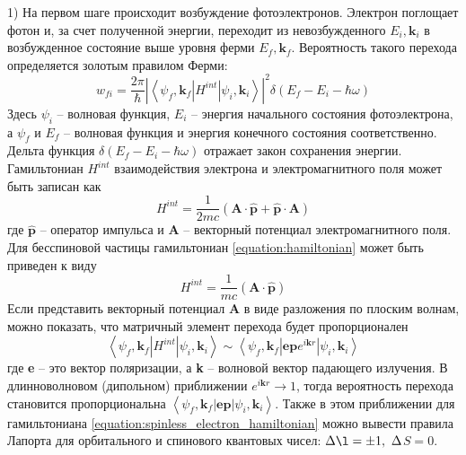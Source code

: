 1) На первом шаге происходит возбуждение фотоэлектронов.
Электрон поглощает фотон и, за счет полученной энергии, переходит из
невозбужденного $E_i, \textbf{k}_i$  в возбужденное состояние выше 
уровня ферми $E_f, \textbf{k}_f$. Вероятность такого перехода 
определяется золотым правилом Ферми:
	\begin{equation} 
		\label{Fermi_rule}
		w_{fi}=\frac{2\pi}{\hbar}|\left\langle\psi_f,\textbf{k}_f|H^{int}|
		\psi_i,\textbf{k}_i\right\rangle|^2\delta(E_f-E_i-\hbar\omega)
	\end{equation}
Здесь $\psi_i$ -- волновая функция, $E_i$ -- энергия начального состояния
фотоэлектрона, а  $\psi_f$ и $E_f$ -- волновая функция и энергия 
конечного состояния соответственно. Дельта функция $\delta(E_f-E_i-\hbar\omega)$
отражает закон сохранения энергии. Гамильтониан $H^{int}$ взаимодействия
электрона и электромагнитного поля может быть записан как
	\begin{equation} 
	\label{equation:hamiltonian}
		H^{int}=\frac{1}{2mc}(\textbf{A}\cdot\hat{\textbf{p}}+\hat{\textbf{p}}\cdot\textbf{A})
	\end{equation}
где $\hat{\textbf{p}}$ -- оператор импульса и $\textbf{A}$ -- векторный потенциал электромагнитного поля. Для бесспиновой частицы гамильтониан
\ref{equation:hamiltonian} может быть приведен к виду
	\begin{equation} 
		\label{equation:hamiltonian}
		H^{int}=\frac{1}{mc}(\textbf{A}\cdot\hat{\textbf{p}})
	\end{equation}
Если представить векторный потенциал \textbf{A} в виде разложения по
плоским волнам, можно показать, что матричный элемент перехода
будет пропорционален
	\begin{equation} 
		\label{equation:spinless_electron_hamiltonian}
		\left\langle\psi_f,\textbf{k}_f|H^{int}|
		\psi_i,\textbf{k}_i\right\rangle\sim
		\left\langle\psi_f,\textbf{k}_f|\textbf{ep}e^{i\textbf{k}r}|
		\psi_i,\textbf{k}_i\right\rangle
	\end{equation}
где \textbf{e} -- это вектор поляризации, а \textbf{k} -- волновой вектор
падающего излучения. В длинноволновом (дипольном) приближении $e^{i\textbf{k}r}\rightarrow 1$, 
тогда вероятность перехода становится пропорциональна
$\left\langle\psi_f,\textbf{k}_f|\textbf{ep}|\psi_i,\textbf{k}_i\right\rangle$. Также в этом приближении для гамильтониана
\ref{equation:spinless_electron_hamiltonian} можно вывести 
правила Лапорта для орбитального и спинового квантовых чисел:
$\Delta\l=\pm1,\ \Delta$$S=0$.


